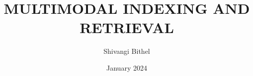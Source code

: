 \documentclass[MS,synopsis]{iitddiss}
\title{MULTIMODAL INDEXING AND RETRIEVAL}
\author{Shivangi Bithel}
\date{January 2024}
\begin{document}
\maketitle

\setcounter{page}{0}
\newpage



\newpage

\newpage

\newpage

\newpage

\newpage

\newpage

\newpage


\begin{singlespace}

\end{singlespace}
\end{document}
